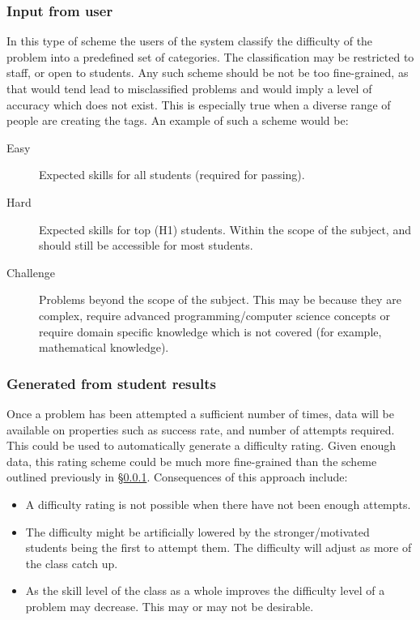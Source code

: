 \subsubsection{Input from user} \label{sec:diffinput}
In this type of scheme the users of the system classify the difficulty of the problem into a predefined set of categories. The classification may be restricted to staff, or open to students. Any such scheme should be not be too fine-grained, as that would tend lead to misclassified problems and would imply a level of accuracy which does not exist. This is especially true when a diverse range of people are creating the tags. An example of such a scheme would be:
\begin{description}
\item[Easy] Expected skills for all students (required for passing).
\item[Hard] Expected skills for top (H1) students. Within the scope of the subject, and should still be accessible for most students.
\item[Challenge] Problems beyond the scope of the subject. This may be because they are complex, require advanced programming/computer science concepts or require domain specific knowledge which is not covered (for example, mathematical knowledge).
\end{description}

\subsubsection{Generated from student results} \label{sec:studres}
Once a problem has been attempted a sufficient number of times, data will be available on properties such as success rate, and number of attempts required. This could be used to automatically generate a difficulty rating. Given enough data, this rating scheme could be much more fine-grained than the scheme outlined previously in \S\ref{sec:diffinput}. Consequences of this approach include:
\begin{itemize}
\item A difficulty rating is not possible when there have not been enough attempts.
\item The difficulty might be artificially lowered by the stronger/motivated students being the first to attempt them. The difficulty will adjust as more of the class catch up.
\item As the skill level of the class as a whole improves the difficulty level of a problem may decrease. This may or may not be desirable.
\end{itemize}

